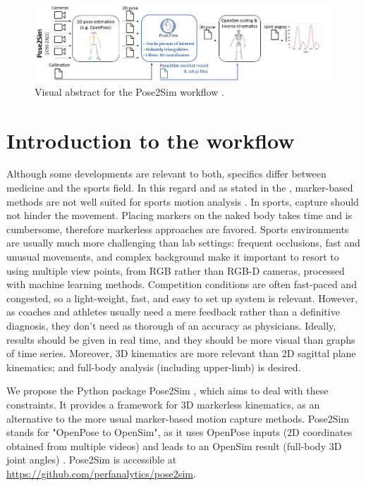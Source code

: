 \vspace*{3cm}

\begin{figure}[hbtp]
	\centering
	\def\svgwidth{1\columnwidth}
	\fontsize{10pt}{10pt}\selectfont
	\includegraphics[width=\linewidth]{"../Intro/Figures/Fig_VisAbstract1.JPG"}
      \caption{Visual abstract for the Pose2Sim workflow \cite{Pagnon2022b}.}
	\label{fig_visabstract1}
\end{figure}

\newpage


\section{Introduction to the workflow}

Although some developments are relevant to both, specifics differ between medicine and the sports field. In this regard and as stated in the , marker-based methods are not well suited for sports motion analysis \cite{Colyer2018}. In sports, capture should not hinder the movement. Placing markers on the naked body takes time and is cumbersome, therefore markerless approaches are favored. Sports environments are usually much more challenging than lab settings: frequent occlusions, fast and unusual movements, and complex background make it important to resort to using multiple view points, from RGB rather than RGB-D cameras, processed with machine learning methods. Competition conditions are often fast-paced and congested, so a light-weight, fast, and easy to set up system is relevant. However, as coaches and athletes usually need a mere feedback rather than a definitive diagnosis, they don't need as thorough of an accuracy as physicians. Ideally, results should be given in real time, and they should be more visual than graphs of time series. Moreover, 3D kinematics are more relevant than 2D sagittal plane kinematics; and full-body analysis (including upper-limb) is desired.

We propose the Python package Pose2Sim \cite{Pagnon2022b}, which aims to deal with these constraints. It provides a framework for 3D markerless kinematics, as an alternative to the more usual marker-based motion capture methods. Pose2Sim stands for "OpenPose to OpenSim", as it uses OpenPose inputs (2D coordinates obtained from multiple videos) \cite{Cao2019} and leads to an OpenSim result (full-body 3D joint angles) \cite{Delp2007,Seth2018}. Pose2Sim is accessible at \url{https://github.com/perfanalytics/pose2sim}.


